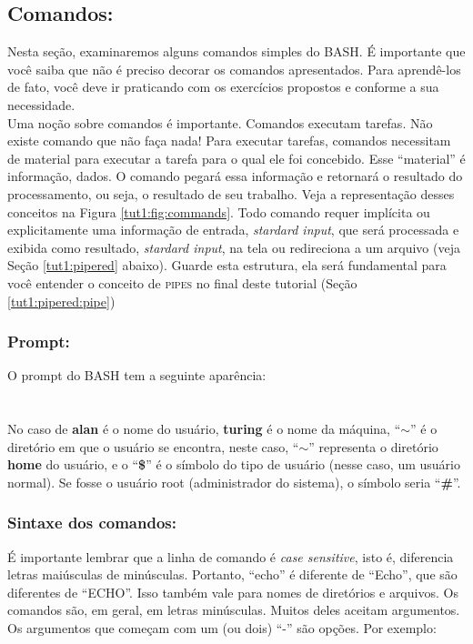 \begin{refsection}
\begin{figure}[H]
  \end{figure}


\subsection{Comandos:}\label{tut1:text_mode:commands:commands}
 Nesta seção, examinaremos alguns comandos simples do BASH. É importante que você saiba que não é preciso decorar os comandos apresentados. Para aprendê-los de fato, você deve ir praticando com os exercícios propostos e conforme a sua necessidade.\\
%
Uma noção sobre comandos é importante. Comandos executam tarefas. Não existe comando que não faça nada! Para executar tarefas, comandos necessitam de material para executar a tarefa para o qual ele foi concebido. Esse ``material'' é informação, dados. O comando pegará essa informação e retornará o resultado do processamento, ou seja, o resultado de seu trabalho. Veja a representação desses conceitos na Figura \ref{tut1:fig:commands}. Todo comando requer implícita ou explicitamente uma informação de entrada, \textit{stardard input}, que será processada e exibida como resultado, \textit{stardard input}, na tela ou redireciona a um arquivo (veja Seção \ref{tut1:pipered} abaixo). Guarde esta estrutura, ela será fundamental para você entender o conceito de \textsc{pipes} no final deste tutorial (Seção \ref{tut1:pipered:pipe})\\
%
\subsubsection{Prompt:}\label{tut1:text_modeommands:prompt}
O prompt do BASH tem a seguinte aparência:\\
\indent\indent\userprompt{ }\\
\\
 No caso de \userprompt{ } \textbf{alan} é o nome do usuário, \textbf{turing} é o nome da máquina, ``\textbf{$\sim$}'' é o diretório em que o usuário se encontra, neste caso, ``\textbf{$\sim$}'' representa o diretório \textbf{home} do usuário, e o ``\textbf{\$}'' é o símbolo do tipo de usuário (nesse caso, um usuário normal). Se fosse o usuário root (administrador do sistema), o símbolo seria ``\textbf{\#}''.\\

\subsubsection{Sintaxe dos comandos:}\label{tut1:text_mode:commands:syntax}
É importante lembrar que a linha de comando é \textit{case sensitive}, isto é, diferencia letras maiúsculas de minúsculas. Portanto, ``echo'' é diferente de ``Echo'', que são diferentes de ``ECHO''. Isso também vale para nomes de diretórios e arquivos. Os comandos são, em geral, em letras minúsculas. Muitos deles aceitam argumentos. Os argumentos que começam com um (ou dois) ``-'' são opções. Por exemplo:\\


\end{refsection}
